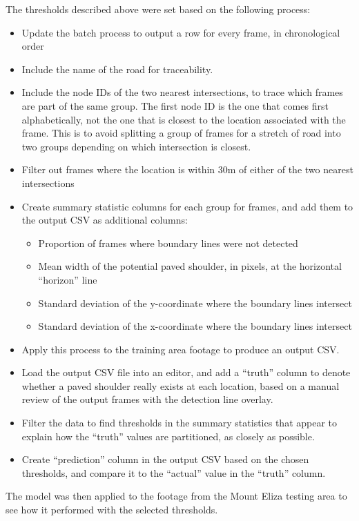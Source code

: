 \documentclass[11pt,twoside]{report}
\begin{document}
The thresholds described above were set based on the following process:

\begin{itemize}
\item{Update the batch process to output a row for every frame, in chronological order}
\item{Include the name of the road for traceability.}
\item{Include the node IDs of the two nearest intersections, to trace which frames are part of the same group.  The first node ID is the one that comes first alphabetically, not the one that is closest to the location associated with the frame.  This is to avoid splitting a group of frames for a stretch of road into two groups depending on which intersection is closest.}
\item{Filter out frames where the location is within 30m of either of the two nearest intersections}
\item{Create summary statistic columns for each group for frames, and add them to the output CSV as additional columns:
	\begin{itemize}
	\item{Proportion of frames where boundary lines were not detected}
	\item{Mean width of the potential paved shoulder, in pixels, at the horizontal ``horizon'' line}
	\item{Standard deviation of the y-coordinate where the boundary lines intersect}
	\item{Standard deviation of the x-coordinate where the boundary lines intersect}
	\end{itemize}
}
\item{Apply this process to the training area footage to produce an output CSV.}
\item{Load the output CSV file into an editor, and add a ``truth'' column to denote whether a paved shoulder really exists at each location, based on a manual review of the output frames with the detection line overlay.}
\item{Filter the data to find thresholds in the summary statistics that appear to explain how the ``truth'' values are partitioned, as closely as possible.}
\item{Create ``prediction'' column in the output CSV based on the chosen thresholds, and compare it to the ``actual'' value in the ``truth'' column.}
\end{itemize}

The model was then applied to the footage from the Mount Eliza testing area to see how it performed with the selected thresholds.
\end{document}
